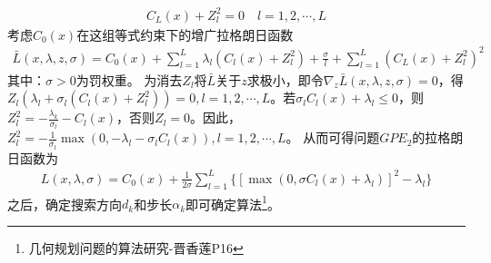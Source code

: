         \begin{align*}
        C_L(x)+Z_l^2=0\quad l=1,2,\cdots,L
        \end{align*}
        考虑$C_0(x)$在这组等式约束下的增广拉格朗日函数
        \begin{align*}
        \bar{L}(x,\lambda,z,\sigma)=C_0(x)+\mathop{\sum}\limits_{l=1}^{L}{\lambda}_l(C_l(x)+Z_l^2)+\frac{\sigma}{l}+\mathop{\sum}\limits_{l=1}^{L}(C_L(x)+Z_l^2)^2
        \end{align*}
        其中：$\sigma>0$为罚权重。
        为消去$Z_l$将$\bar{L}$关于$z$求极小，即令${\nabla}_z\bar{L}(x,\lambda,z,\sigma)=0$，得$Z_l({\lambda}_l+{\sigma}_l(C_l(x)+Z_l^2))=0,l=1,2,\cdots,L$。若${\sigma}_lC_l(x)+{\lambda}_l\leqslant 0$，则$Z_l^2=-\frac{{\lambda}_k}{{\sigma}_l}-C_l(x)$，否则$Z_l=0$。因此，$Z_l^2=-\frac{1}{{\sigma}_l}{\max}(0,-{\lambda}_l-{\sigma}_lC_l(x)),l=1,2,\cdots,L$。
        从而可得问题$GPE_2$的拉格朗日函数为
        \begin{align*}
        {L}(x,\lambda,\sigma)=C_0(x)+\frac{1}{2{\sigma}}\mathop{\sum}\limits_{l=1}^{L}\{[{\max}(0,{\sigma}C_l(x)+{\lambda}_l)]^2-{\lambda}_l \}
        \end{align*}
        之后，确定搜索方向$d_k$和步长${\alpha}_k$即可确定算法\footnote{几何规划问题的算法研究-晋香莲P16}。
